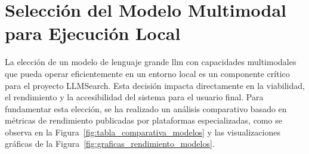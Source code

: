 \begin{table}[h!]
  \centering
  \captionsetup{justification=centering} %
  \caption{Comparativa de modelos representativos en lenguaje y multimodalidad.}
  \label{tab:comparativa_modelos}
\end{table}

\section{Selección del Modelo Multimodal para Ejecución Local}

La elección de un modelo de lenguaje grande \gls{llm} con capacidades multimodales que pueda operar eficientemente en un entorno local es un componente crítico para el proyecto LLMSearch. Esta decisión impacta directamente en la viabilidad, el rendimiento y la accesibilidad del sistema para el usuario final. Para fundamentar esta elección, se ha realizado un análisis comparativo basado en métricas de rendimiento publicadas por plataformas especializadas, como se observa en la Figura~\ref{fig:tabla_comparativa_modelos} y las visualizaciones gráficas de la Figura~\ref{fig:graficas_rendimiento_modelos}.

